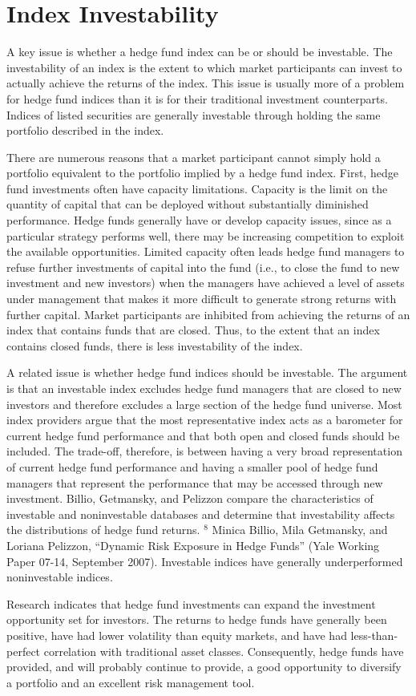 \documentclass[11pt]{article}
\begin{document}
\section*{Index Investability}
A key issue is whether a hedge fund index can be or should be investable. The investability of an index is the extent to which market participants can invest to actually achieve the returns of the index. This issue is usually more of a problem for hedge fund indices than it is for their traditional investment counterparts. Indices of listed securities are generally investable through holding the same portfolio described in the index.

There are numerous reasons that a market participant cannot simply hold a portfolio equivalent to the portfolio implied by a hedge fund index. First, hedge fund investments often have capacity limitations. Capacity is the limit on the quantity of capital that can be deployed without substantially diminished performance. Hedge funds generally have or develop capacity issues, since as a particular strategy performs well, there may be increasing competition to exploit the available opportunities. Limited capacity often leads hedge fund managers to refuse further investments of capital into the fund (i.e., to close the fund to new investment and new investors) when the managers have achieved a level of assets under management that makes it more difficult to generate strong returns with further capital. Market participants are inhibited from achieving the returns of an index that contains funds that are closed. Thus, to the extent that an index contains closed funds, there is less investability of the index.

A related issue is whether hedge fund indices should be investable. The argument is that an investable index excludes hedge fund managers that are closed to new investors and therefore excludes a large section of the hedge fund universe. Most index providers argue that the most representative index acts as a barometer for current hedge fund performance and that both open and closed funds should be included. The trade-off, therefore, is between having a very broad representation of current hedge fund performance and having a smaller pool of hedge fund managers that represent the performance that may be accessed through new investment. Billio, Getmansky, and Pelizzon compare the characteristics of investable and noninvestable databases and determine that investability affects the distributions of hedge fund returns. ${ }^{8}$ Minica Billio, Mila Getmansky, and Loriana Pelizzon, “Dynamic Risk Exposure in Hedge Funds” (Yale Working Paper 07-14, September 2007). Investable indices have generally underperformed noninvestable indices.

Research indicates that hedge fund investments can expand the investment opportunity set for investors. The returns to hedge funds have generally been positive, have had lower volatility than equity markets, and have had less-than-perfect correlation with traditional asset classes. Consequently, hedge funds have provided, and will probably continue to provide, a good opportunity to diversify a portfolio and an excellent risk management tool.
\end{document}
